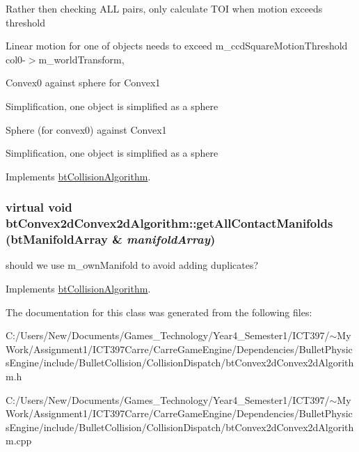 Rather then checking ALL pairs, only calculate TOI when motion exceeds threshold

Linear motion for one of objects needs to exceed m\_\-ccdSquareMotionThreshold col0-$>$m\_\-worldTransform,

Convex0 against sphere for Convex1

Simplification, one object is simplified as a sphere

Sphere (for convex0) against Convex1

Simplification, one object is simplified as a sphere 

Implements \hyperlink{classbt_collision_algorithm}{btCollisionAlgorithm}.\hypertarget{classbt_convex2d_convex2d_algorithm_de3af2f3f04d9b202535d33550a94be4}{
\subsubsection[getAllContactManifolds]{\setlength{\rightskip}{0pt plus 5cm}virtual void btConvex2dConvex2dAlgorithm::getAllContactManifolds ({\bf btManifoldArray} \& {\em manifoldArray})}}
\label{classbt_convex2d_convex2d_algorithm_de3af2f3f04d9b202535d33550a94be4}




should we use m\_\-ownManifold to avoid adding duplicates? 

Implements \hyperlink{classbt_collision_algorithm}{btCollisionAlgorithm}.

The documentation for this class was generated from the following files:\begin{CompactItemize}
\item 
C:/Users/New/Documents/Games\_\-Technology/Year4\_\-Semester1/ICT397/$\sim$My Work/Assignment1/ICT397Carre/CarreGameEngine/Dependencies/BulletPhysicsEngine/include/BulletCollision/CollisionDispatch/btConvex2dConvex2dAlgorithm.h\item 
C:/Users/New/Documents/Games\_\-Technology/Year4\_\-Semester1/ICT397/$\sim$My Work/Assignment1/ICT397Carre/CarreGameEngine/Dependencies/BulletPhysicsEngine/include/BulletCollision/CollisionDispatch/btConvex2dConvex2dAlgorithm.cpp\end{CompactItemize}
